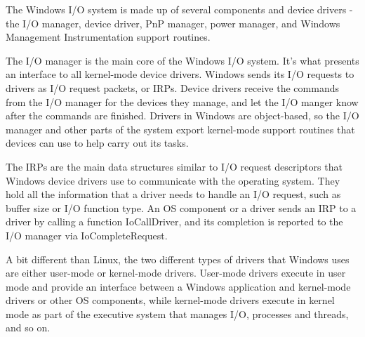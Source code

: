 \documentclass[10pt,draftclsnofoot,onecolumn,letterpaper]{IEEEtran}
\begin{document}
The Windows I/O system is made up of several components and device drivers - the I/O manager, device driver, PnP manager, power manager, and Windows Management Instrumentation support routines. \par
The I/O manager is the main core of the Windows I/O system. It's what presents an interface to all kernel-mode device drivers. Windows sends its I/O requests to drivers as I/O request packets, or IRPs\cite{10}. Device drivers receive the commands from the I/O manager for the devices they manage, and let the I/O manger know after the commands are finished. Drivers in Windows are object-based, so the I/O manager and other parts of the system export kernel-mode support routines that devices can use to help carry out its tasks\cite{10}. \par
The IRPs are the main data structures similar to I/O request descriptors that Windows device drivers use to communicate with the operating system. They hold all the information that a driver needs to handle an I/O request, such as buffer size or I/O function type. An OS component or a driver sends an IRP to a driver by calling a function IoCallDriver, and its completion is reported to the I/O manager via IoCompleteRequest\cite{10}. \par
A bit different than Linux, the two different types of drivers that Windows uses are either user-mode or kernel-mode drivers. User-mode drivers execute in user mode and provide an interface between a Windows application and kernel-mode drivers or other OS components, while kernel-mode drivers execute in kernel mode as part of the executive system that manages I/O, processes and threads, and so on\cite{9}. \par

\vspace{5mm}
\end{document}

